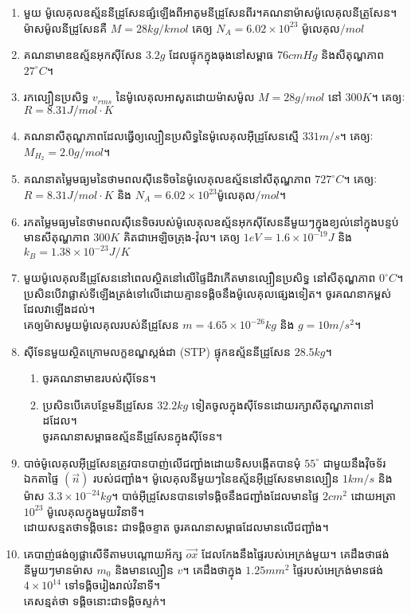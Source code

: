 \begin{enumerate}[m]
\begin{enumerate}[k]
	\end{enumerate}
	\item មួយ ម៉ូលេគុលឧស្ម័ននីដ្រូសែនផ្សំឡើងពីអាតូមនីដ្រូសែនពីរ។គណនាម៉ាសម៉ូលេគុលនីត្រូសែន។\\ ម៉ាសម៉ូលនីដ្រូសែនគឺ $M=28kg/kmol$ គេឲ្យ $N_{A}=6.02\times10^{23}$ ម៉ូលេគុល$/mol$
	\item គណនាមាឌឧស្ម័នអុកសុីសែន $3.2g$ ដែលផ្ទុកក្នុងធុងនៅសម្ពាធ $76cmHg$ និងសីតុណ្ហភាព $27^\circ C$។
	\item រកល្បឿនប្រសិទ្ធ $v_{rms}$ នៃម៉ូលេគុលអាសូតដោយម៉ាសម៉ូល $M=28g/mol$ នៅ $300K$។ គេឲ្យៈ $R=8.31J/mol\cdot K$
	\item គណនាសីតុណ្ហភាពដែលធ្វើឲ្យល្បឿនប្រសិទ្ធនៃម៉ូលេគុលអុីដ្រូសែនស្មើ $331m/s$។ គេឲ្យៈ $M_{H_{2}}=2.0g/mol$។ 
	\item គណនាតម្លៃមធ្យមនៃថាមពលសុីនេទិចនៃម៉ូលេគុលឧស្ម័ននៅសីតុណ្ហភាព $727^\circ C$។ គេឲ្យៈ $R=8.31J/mol\cdot K$ និង $N_{A}=6.02\times10^{23}$ម៉ូលេគុល$/mol$។
	\item រកតម្លៃមធ្យមនៃថាមពលសុីនេទិចរបស់ម៉ូលេគុលឧស្ម័នអុកសុីសែននីមួយៗក្នុងខ្យល់នៅក្នុងបន្ទប់មានសីតុណ្ហភាព $300K$ គិតជាអេឡិចត្រុង-វ៉ុល។ គេឲ្យ $1eV=1.6\times10^{-19}J$ និង $k_{B}=1.38\times10^{-23}J/K$
	\item មួយម៉ូលេគុលនីដ្រូសែននៅពេលស្ថិតនៅលើផ្ទៃដីវាកើតមានល្បឿនប្រសិទ្ធ នៅសីតុណ្ហភាព $0^\circ C$។ ប្រសិនបើវាផ្លាស់ទីឡើងត្រង់ទៅលើដោយគ្មានទង្គិចនឹងម៉ូលេគុលផ្សេងទៀត។ ចូរគណនាកម្ពស់ដែលវាឡើងដល់។ \\គេឲ្យម៉ាសមួយម៉ូលេគុលរបស់នីដ្រូសែន $m=4.65\times10^{-26}kg$ និង $g=10m/s^{2}$។
	\item សុីទែនមួយស្ថិតក្រោមលក្ខខណ្ឌស្តង់ដា {\en (STP)} ផ្ទុកឧស្ម័ននីដ្រូសែន $28.5kg$។
	\begin{enumerate}[k]
		\item ចូរគណនាមាឌរបស់សុីទែន។
		\item ប្រសិនបើគេបន្ថែមនីដ្រូសែន $32.2kg$ ទៀតចូលក្នុងសុីទែនដោយរក្សាសីតុណ្ហភាពនៅដដែល។ \\ចូរគណនាសម្ពាធឧស្ម័ននីដ្រូសែនក្នុងសុីទែន។
	\end{enumerate}
	\item បាច់ម៉ូលេគុលអុីដ្រូសែនត្រូវបានបាញ់លើជញ្ជាំងដោយទិសបង្កើតបានមុំ $55^\circ$ ជាមួយនឹងវុិចទ័រឯកតាផ្ទៃ $\left(\overrightarrow{n}\right)$ របស់ជញ្ជាំង។ ម៉ូលេគុលនីមួយៗនៃឧស្ម័នអុីដ្រូសែនមានល្បឿន $1km/s$ និងម៉ាស $3.3\times10^{-24}kg$។ បាច់អុីដ្រូសែនបានទៅទង្គិចនឹងជញ្ជាំងដែលមានផ្ទៃ $2cm^{2}$ ដោយអត្រា $10^{23}$ ម៉ូលេគុលក្នុងមួយវិនាទី។\\ ដោយសន្មតថាទង្គិចនេះ ជាទង្គិចខ្ទាត ចូរគណនាសម្ពាធដែលមានលើជញ្ជាំង។
	\item គេបាញ់ផង់ឲ្យផ្លាសើទីតាមបណ្តោយអ័ក្ស $\overrightarrow{ox}$ ដែលកែងនឹងផ្ទៃរបស់អេក្រង់មួយ។ គេដឹងថាផង់នីមួយៗមានម៉ាស $m_{0}$ និងមានល្បឿន $v$។ គេដឹងថាក្នុង $1.25mm^{2}$ ផ្ទៃរបស់អេក្រង់មានផង់ $4\times10^{14}$ ទៅទង្គិចរៀងរាល់វិនាទី។\\ គេសន្មត់ថា ទង្គិចនោះជាទង្គិចស្ទក់។

\end{enumerate}
